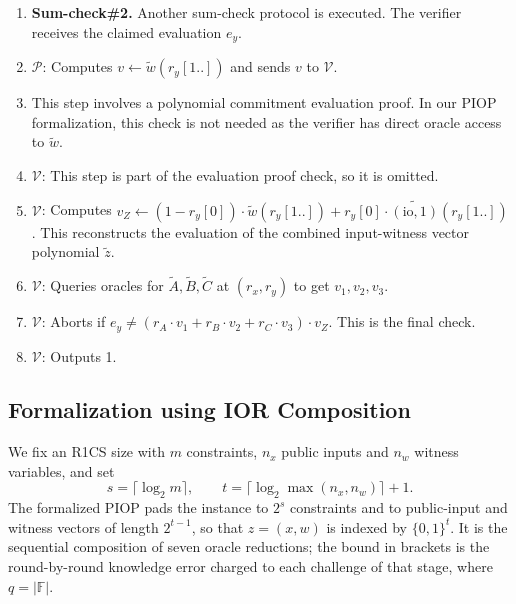 \begin{description}
\begin{enumerate}
        \item \textbf{Sum-check\#2.} Another sum-check protocol is executed. The verifier receives the claimed evaluation $e_y$.
        \item $\mathcal{P}$: Computes $v \leftarrow \tilde{w}(r_y[1..])$ and sends $v$ to $\mathcal{V}$.
        \item This step involves a polynomial commitment evaluation proof. In our PIOP formalization, this check is not needed as the verifier has direct oracle access to $\tilde{w}$.
        \item $\mathcal{V}$: This step is part of the evaluation proof check, so it is omitted.
        \item $\mathcal{V}$: Computes $v_Z \leftarrow (1 - r_y[0]) \cdot \tilde{w}(r_y[1..]) + r_y[0] \cdot \widetilde{(\text{io}, 1)}(r_y[1..])$. This reconstructs the evaluation of the combined input-witness vector polynomial $\tilde{z}$.
        \item $\mathcal{V}$: Queries oracles for $\tilde{A}, \tilde{B}, \tilde{C}$ at $(r_x, r_y)$ to get $v_1, v_2, v_3$.
        \item $\mathcal{V}$: Aborts if $e_y \neq (r_A \cdot v_1 + r_B \cdot v_2 + r_C \cdot v_3) \cdot v_Z$. This is the final check.
        \item $\mathcal{V}$: Outputs 1.
    \end{enumerate}
\end{description}

\subsection{Formalization using IOR Composition}

We fix an R1CS size with $m$ constraints, $n_x$ public inputs and $n_w$ witness variables, and set
\[
  s = \lceil \log_2 m \rceil, \qquad t = \lceil \log_2 \max(n_x, n_w) \rceil + 1.
\]
The formalized PIOP pads the instance to $2^s$ constraints and to public-input and witness
vectors of length $2^{t-1}$, so that $z = (x, w)$ is indexed by $\{0,1\}^t$. It is the sequential
composition of seven oracle reductions; the bound in brackets is the round-by-round knowledge
error charged to each challenge of that stage, where $q = |\mathbb{F}|$.

